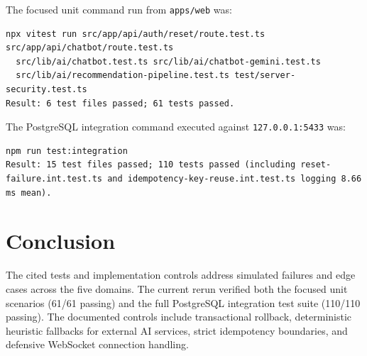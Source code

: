 \documentclass[10pt]{article}
\begin{document}
The focused unit command run from \texttt{apps/web} was:
\begin{verbatim}
npx vitest run src/app/api/auth/reset/route.test.ts src/app/api/chatbot/route.test.ts
  src/lib/ai/chatbot.test.ts src/lib/ai/chatbot-gemini.test.ts
  src/lib/ai/recommendation-pipeline.test.ts test/server-security.test.ts
Result: 6 test files passed; 61 tests passed.
\end{verbatim}
The PostgreSQL integration command executed against \texttt{127.0.0.1:5433} was:
\begin{verbatim}
npm run test:integration
Result: 15 test files passed; 110 tests passed (including reset-failure.int.test.ts and idempotency-key-reuse.int.test.ts logging 8.66 ms mean).
\end{verbatim}

\section{Conclusion}
The cited tests and implementation controls address simulated failures and edge cases across the five domains. The current rerun verified both the focused unit scenarios (61/61 passing) and the full PostgreSQL integration test suite (110/110 passing). The documented controls include transactional rollback, deterministic heuristic fallbacks for external AI services, strict idempotency boundaries, and defensive WebSocket connection handling.
\end{document}
